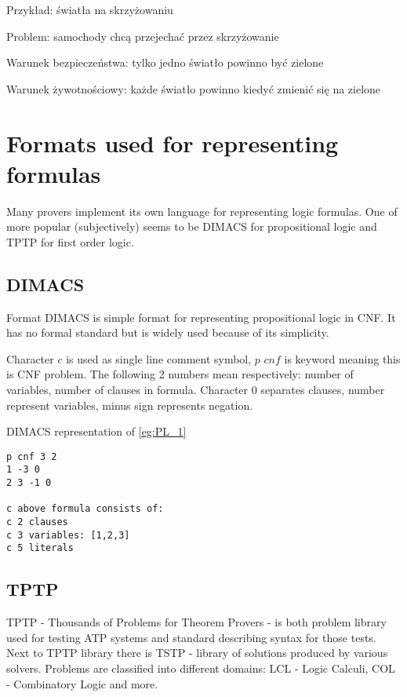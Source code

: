 Przykład: światła na skrzyżowaniu

\noindent
Problem: samochody chcą przejechać przez skrzyżowanie

\noindent
Warunek bezpieczeństwa: tylko jedno światło powinno być zielone

\noindent
Warunek żywotnościowy: każde światło powinno kiedyć zmienić się na zielone

\section{Formats used for representing formulas}

Many provers implement its own language for representing logic formulas. One of more popular (subjectively)  seems to be DIMACS for propositional logic and TPTP for first order logic.

\subsection{DIMACS}

Format DIMACS is simple format for representing propositional logic in \gls{CNF}. It has no formal standard but is widely used because of its simplicity.

Character $c$ is used as single line comment symbol, $p$ $cnf$ is keyword meaning this is \gls{CNF} problem. The following 2 numbers mean respectively: number of variables, number of clauses in formula.  Character $0$ separates clauses, number represent variables, minus sign represents negation.


\begin{listing}[H]
  \caption{DIMACS representation of \ref{eg:PL_1}}
  \begin{verbatim}
p cnf 3 2
1 -3 0
2 3 -1 0

c above formula consists of:
c 2 clauses
c 3 variables: [1,2,3]
c 5 literals
  \end{verbatim}
\end{listing}

\subsection{TPTP}

\gls{TPTP} \cite{Sut17} - Thousands of Problems for Theorem Provers - is both problem library used for testing \gls{ATP} systems and standard describing syntax for those tests. Next to TPTP library there is \gls{TSTP} - library of solutions produced by various solvers. Problems are classified into different domains: LCL - Logic Calculi, COL - Combinatory Logic and more.

